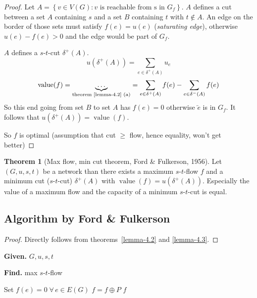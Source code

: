\documentclass[a4paper]{article}
\theoremstyle{definition}
\newtheorem{theorem}{Theorem}
\newcommand{\set}[1]{\left\{#1\right\}}
\newcommand{\given}[1]{\textbf{Given.} #1\par}
\newcommand{\find}[1]{\textbf{Find.} #1\par}
\newcommand{\gath}[2]{$#1$-$#2$-path} %
\newcommand{\flow}[2]{$#1$-$#2$-flow}
\newcommand{\fall}{\;\forall\,}
\begin{document}
\begin{proof}
  Let $A = \set{v \in V(G): v \text{ is reachable from s in } G_f}$.
  $A$ defines a cut between a set $A$ containing $s$ and a set $B$ containing $t$ with $t \notin A$.
  An edge on the border of those sets must satisfy $f(e) = u(e)$ (\emph{saturating edge}),
  otherwise $u(e) - f(e) > 0$ and the edge would be part of $G_f$.

  $A$ defines a $s$-$t$-cut $\delta^+(A)$.
  \[
    u(\delta^+(A)) = \sum_{e \in \delta^+(A)} u_e
  \] \[
    \operatorname{value}(f) = \underbrace{\dots}_{\text{theorem~\ref{lemma-4.2} (a)}}
      = \sum_{e \in \delta^+(A)} f(e) - \sum_{e \in \delta^-(A)} f(e)
  \]
  So this end going from set $B$ to set $A$ has $f(e) = 0$ otherwise
  $\overleftarrow{e}$ is in $G_f$. It follows that $u(\delta^+(A)) = \operatorname{value}(f)$.

  So $f$ is optimal (assumption that cut $\geq$ flow, hence equality, won't get better)
\end{proof}

\begin{theorem}[Max flow, min cut theorem, Ford \& Fulkerson, 1956]
  \label{satz-4.4}
  Let $(G, u, s, t)$ be a network than there exists a maximum \flow st $f$
  and a minimum cut ($s$-$t$-cut) $\delta^+(A)$ with $\operatorname{value}(f) = u(\delta^+(A))$.
  Especially the value of a maximum flow and the capacity of a minimum $s$-$t$-cut is equal.
\end{theorem}

\subsection{Algorithm by Ford \& Fulkerson}

\begin{proof}
  Directly follows from theorems~\ref{lemma-4.2} and \ref{lemma-4.3}.
\end{proof}

\begin{algorithm}
  \caption{Algorithm by Ford \& Fulkerson}
  \label{fnf-algo}
  \given{$G, u, s, t$}
  \find{max \flow st}
\begin{algorithmic}[1]
  \State Set $f(e) = 0 \fall e \in E(G)$
  \While{$\exists$ \gath st $P$ in $G_f$}
    \State $f = f \oplus P$
  \EndWhile
  \State \Return $f$
\end{algorithmic}
\end{algorithm}
\end{document}
